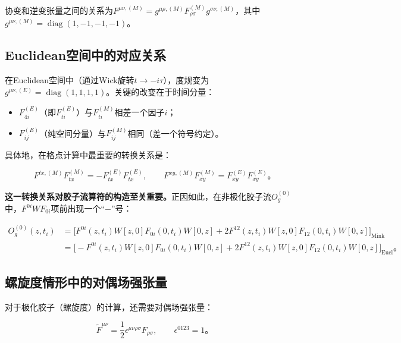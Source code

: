 \documentclass[12pt,a4paper]{ctexart}
\theoremstyle{definition}
\begin{document}
协变和逆变张量之间的关系为$F^{\mu\nu,(M)} = g^{\mu\rho,(M)} F^{(M)}_{\rho\sigma} g^{\sigma\nu,(M)}$，其中$g^{\mu\nu,(M)} = \operatorname{diag}(1,-1,-1,-1)$。

\subsection{Euclidean空间中的对应关系}

在Euclidean空间中（通过Wick旋转$t \to -i\tau$），度规变为$g^{\mu\nu,(E)} = \operatorname{diag}(1,1,1,1)$。关键的改变在于时间分量：

\begin{itemize}
    \item $F^{(E)}_{4i}$（即$F^{(E)}_{ti}$）与$F^{(M)}_{ti}$相差一个因子$i$；
    \item $F^{(E)}_{ij}$（纯空间分量）与$F^{(M)}_{ij}$相同（差一个符号约定）。
\end{itemize}

具体地，在格点计算中最重要的转换关系是\cite{NoteGluonPDFs}：

\begin{equation}
\boxed{F^{tx,(M)}F^{(M)}_{tx} = -F^{(E)}_{tx}F^{(E)}_{tx}}, \qquad
\boxed{F^{xy,(M)}F^{(M)}_{xy} = F^{(E)}_{xy}F^{(E)}_{xy}}。
\label{eq:ME_conversion}
\end{equation}

\textbf{这一转换关系对胶子流算符的构造至关重要。}正因如此，在非极化胶子流$O^{(0)}_g$中，$F^{0i}WF_{0i}$项前出现一个``$-$''号\cite{NoteGluonPDFs,Chen2025gluon}：

\begin{equation}
\begin{aligned}
O^{(0)}_g(z, t_i) &= \Big[ F^{0i}(z,t_i)W[z,0]F_{0i}(0,t_i)W[0,z] + 2F^{12}(z,t_i)W[z,0]F_{12}(0,t_i)W[0,z] \Big]_{\text{Mink}} \\
&= \Big[ -F^{0i}(z,t_i)W[z,0]F_{0i}(0,t_i)W[0,z] + 2F^{12}(z,t_i)W[z,0]F_{12}(0,t_i)W[0,z] \Big]_{\text{Eucl}}。
\end{aligned}
\label{eq:gluon_current_ME}
\end{equation}

\subsection{螺旋度情形中的对偶场强张量}

对于极化胶子（螺旋度）的计算，还需要对偶场强张量\cite{NoteGluonPDFs,Egerer2022}：

\begin{equation}
\tilde{F}^{\mu\nu} = \frac{1}{2}\epsilon^{\mu\nu\rho\sigma}F_{\rho\sigma}, \qquad \epsilon^{0123} = 1。
\label{eq:dual_F}
\end{equation}
\end{document}
